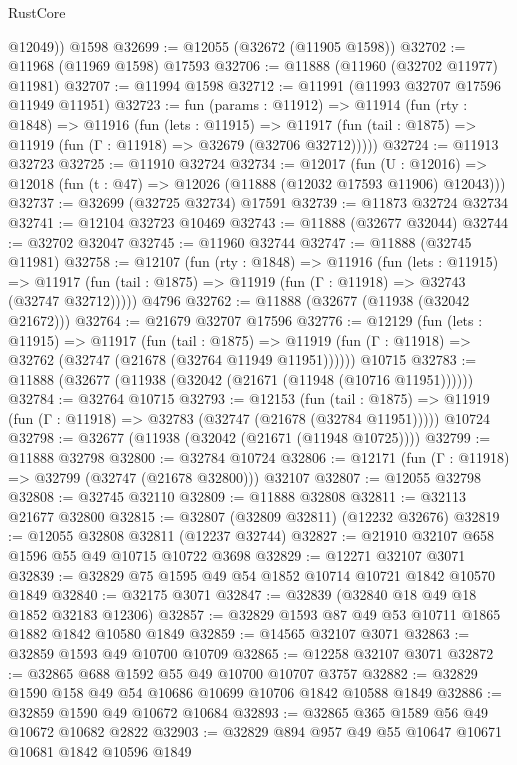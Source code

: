 \begin{lexlean}{RustCore}
\begin{coremodule}
        @12049))
    @1598
@32699 := @12055 (@32672 (@11905 @1598))
@32702 := @11968 (@11969 @1598) @17593
@32706 := @11888 (@11960 (@32702 @11977) @11981)
@32707 := @11994 @1598
@32712 := @11991 (@11993 @32707 @17596 @11949 @11951)
@32723 := fun (params : @11912) =>
  @11914
    (fun (rty : @1848) =>
    @11916
      (fun (lets : @11915) =>
      @11917 (fun (tail : @1875) => @11919 (fun (Γ : @11918) => @32679 (@32706 @32712)))))
@32724 := @11913 @32723
@32725 := @11910 @32724
@32734 := @12017
    (fun (U : @12016) => @12018 (fun (t : @47) => @12026 (@11888 (@12032 @17593 @11906) @12043)))
@32737 := @32699 (@32725 @32734) @17591
@32739 := @11873 @32724 @32734
@32741 := @12104 @32723 @10469
@32743 := @11888 (@32677 @32044)
@32744 := @32702 @32047
@32745 := @11960 @32744
@32747 := @11888 (@32745 @11981)
@32758 := @12107
    (fun (rty : @1848) =>
    @11916
      (fun (lets : @11915) =>
      @11917 (fun (tail : @1875) => @11919 (fun (Γ : @11918) => @32743 (@32747 @32712)))))
    @4796
@32762 := @11888 (@32677 (@11938 (@32042 @21672)))
@32764 := @21679 @32707 @17596
@32776 := @12129
    (fun (lets : @11915) =>
    @11917
      (fun (tail : @1875) =>
      @11919 (fun (Γ : @11918) => @32762 (@32747 (@21678 (@32764 @11949 @11951))))))
    @10715
@32783 := @11888 (@32677 (@11938 (@32042 (@21671 (@11948 (@10716 @11951))))))
@32784 := @32764 @10715
@32793 := @12153
    (fun (tail : @1875) => @11919 (fun (Γ : @11918) => @32783 (@32747 (@21678 (@32784 @11951)))))
    @10724
@32798 := @32677 (@11938 (@32042 (@21671 (@11948 @10725))))
@32799 := @11888 @32798
@32800 := @32784 @10724
@32806 := @12171 (fun (Γ : @11918) => @32799 (@32747 (@21678 @32800))) @32107
@32807 := @12055 @32798
@32808 := @32745 @32110
@32809 := @11888 @32808
@32811 := @32113 @21677 @32800
@32815 := @32807 (@32809 @32811) (@12232 @32676)
@32819 := @12055 @32808 @32811 (@12237 @32744)
@32827 := @21910 @32107 @658 @1596 @55 @49 @10715 @10722 @3698
@32829 := @12271 @32107 @3071
@32839 := @32829 @75 @1595 @49 @54 @1852 @10714 @10721 @1842 @10570 @1849
@32840 := @32175 @3071
@32847 := @32839 (@32840 @18 @49 @18 @1852 @32183 @12306)
@32857 := @32829 @1593 @87 @49 @53 @10711 @1865 @1882 @1842 @10580 @1849
@32859 := @14565 @32107 @3071
@32863 := @32859 @1593 @49 @10700 @10709
@32865 := @12258 @32107 @3071
@32872 := @32865 @688 @1592 @55 @49 @10700 @10707 @3757
@32882 := @32829 @1590 @158 @49 @54 @10686 @10699 @10706 @1842 @10588 @1849
@32886 := @32859 @1590 @49 @10672 @10684
@32893 := @32865 @365 @1589 @56 @49 @10672 @10682 @2822
@32903 := @32829 @894 @957 @49 @55 @10647 @10671 @10681 @1842 @10596 @1849

\end{coremodule}
\end{lexlean}
